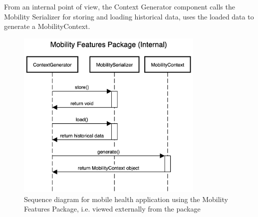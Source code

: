 From an internal point of view, the Context Generator component calls the Mobility Serializer for storing and loading historical data, uses the loaded data to generate a MobilityContext.

\begin{figure}[h]
\centering
\includegraphics[width=0.8\textwidth]{images/diagrams/sequence-internal.png}
\caption{Sequence diagram for mobile health application using the Mobility Features Package, i.e. viewed externally from the package}
\label{fig:sequence-diagram-external}
\end{figure}